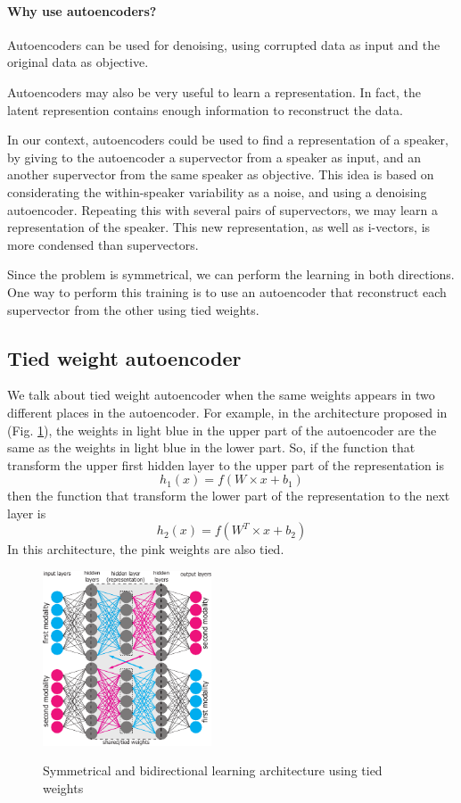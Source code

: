 \documentclass[conference]{IEEEtran}
\begin{document}
\paragraph{Why use autoencoders?}

Autoencoders can be used for denoising, using corrupted data as input and the original data as objective.

Autoencoders may also be very useful to learn a representation. In fact, the latent represention contains enough information to reconstruct the data.

In our context, autoencoders could be used to find a representation of a speaker, by giving to the autoencoder a supervector from a speaker as input, and an another supervector from the same speaker as objective. This idea is based on considerating the within-speaker variability as a noise, and using a denoising autoencoder. Repeating this with several pairs of supervectors, we may learn a representation of the speaker. This new representation, as well as i-vectors, is more condensed than supervectors.

Since the problem is symmetrical, we can perform the learning in both directions. One way to perform this training is to use an autoencoder that reconstruct each supervector from the other using tied weights.

\subsection{Tied weight autoencoder}


We talk about tied weight autoencoder when the same weights appears in two different places in the autoencoder. For example, in the architecture proposed in \cite{vukotic:hal-01314302}
(Fig. \ref{archi_vedran}), the weights in light blue in the upper part of the
autoencoder are the same as the weights in light blue in the lower part. So, if
the function that transform the upper first hidden layer to the upper part of
the representation is
\begin{equation}
 h_1(x) = f(W \times x + b_1) 
\end{equation}
then  the function that transform the lower part of the representation to the
next layer is
\begin{equation}
 h_2(x) = f(W^T \times x + b_2) 
\end{equation}
In this architecture, the pink weights are also tied. 

\begin{figure}[!h]
    \centering
    \caption{Symmetrical and bidirectional learning architecture using tied weights}
    \includegraphics[width=5cm]{archi-vedran.pdf}
    \label{archi_vedran}
\end{figure}
\end{document}
